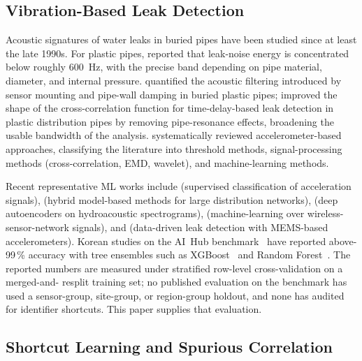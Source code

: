 \documentclass[3p,times,authoryear]{elsarticle}
\theoremstyle{remark}
\begin{document}
\subsection{Vibration-Based Leak Detection}

Acoustic signatures of water leaks in buried pipes have been
studied since at least the late 1990s. For plastic pipes,
\citet{hunaidi2000plastic} reported that leak-noise energy is
concentrated below roughly 600~Hz, with the precise band
depending on pipe material, diameter, and internal pressure.
\citet{almeida2014leak} quantified the acoustic filtering
introduced by sensor mounting and pipe-wall damping in buried
plastic pipes; \citet{gao2017model} improved the shape of the
cross-correlation function for time-delay-based leak detection
in plastic distribution pipes by removing pipe-resonance
effects, broadening the usable bandwidth of the analysis.
\citet{ismail2019review} systematically reviewed
accelerometer-based approaches, classifying the literature into
threshold methods, signal-processing methods (cross-correlation,
EMD, wavelet), and machine-learning methods.

Recent representative ML works include
\citet{shukla2020leakage} (supervised classification of
acceleration signals), \citet{fereidooni2021hybrid}
(hybrid model-based methods for large distribution networks),
\citet{cody2020leak} (deep autoencoders on hydroacoustic
spectrograms), \citet{liu2019leakage} (machine-learning over
wireless-sensor-network signals), and \citet{tariq2022leak}
(data-driven leak detection with MEMS-based accelerometers).
Korean studies on the AI~Hub
benchmark~\cite{lee2023leak} have reported above-99\,\%
accuracy with tree ensembles such as
XGBoost~\cite{chen2016xgboost} and Random
Forest~\cite{breiman2001rf}. The reported numbers are measured
under stratified row-level cross-validation on a merged-and-
resplit training set; no published evaluation on the benchmark
has used a sensor-group, site-group, or region-group holdout,
and none has audited for identifier shortcuts. This paper
supplies that evaluation.

\subsection{Shortcut Learning and Spurious Correlation}
\end{document}

